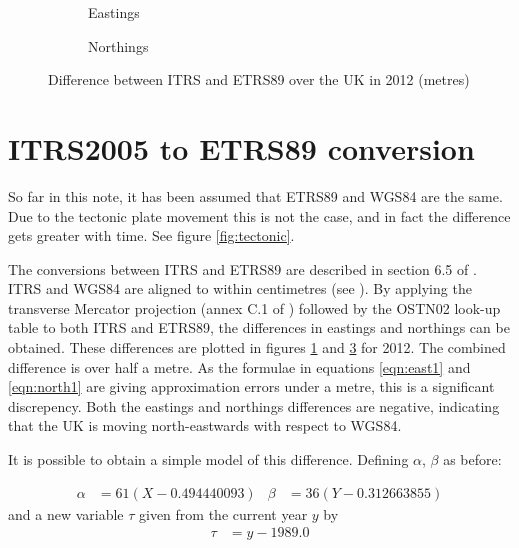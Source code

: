 \documentclass[10pt,a4paper]{article}
\def\tkname#1{}
\def\gap{\hspace{2cm}}
\begin{document}
\begin{figure}[htb]
  \begin{subfigure}[b]{0.4\textwidth}
    \tkname{itrs-etrs-east}
  \centering
  \fbox{
    
  }
  \caption{Eastings}
  \label{fig:itrs-etrs-east}
\end{subfigure}
\gap
  \begin{subfigure}[b]{0.4\textwidth}
    \tkname{itrs-etrs-north}
  \centering
  \fbox{
    
  }
  \caption{Northings}
  \label{fig:itrs-etrs-north}
\end{subfigure}
\caption{Difference between ITRS and ETRS89 over the UK in 2012 (metres)}
\hrulefill
\end{figure}

\section {ITRS2005 to ETRS89 conversion}

So far in this note, it has been assumed that ETRS89 and WGS84 are the same.
Due to the tectonic plate movement this is not the case, and in fact the
difference gets greater with time.  See figure \ref{fig:tectonic}.

The conversions between ITRS and ETRS89 are described in section 6.5 of
\cite{gcs}.  ITRS and WGS84 are aligned to within centimetres (see
\cite{itrs-wgs}).  By applying the transverse Mercator projection (annex C.1 of
\cite{gcs}) followed by the OSTN02 look-up table to both ITRS and ETRS89, the
differences in eastings and northings can be obtained.  These differences are
plotted in figures \ref{fig:itrs-etrs-east} and \ref{fig:itrs-etrs-north} for
2012.  The combined difference is over half a metre.  As the formulae in
equations \eqref{eqn:east1} and \eqref{eqn:north1} are giving approximation
errors under a metre, this is a significant discrepency.  Both the eastings and
northings differences are negative, indicating that the UK is moving
north-eastwards with respect to WGS84.

It is possible to obtain a simple model of this difference.  Defining $\alpha$,
$\beta$ as before:

\begin{align}
  \alpha &= 61 (X-0.494440093) &
  \beta  &= 36 (Y-0.312663855)
\end{align}
and a new variable $\tau$ given from the current year $y$ by
\begin{align}
  \tau   &= y - 1989.0
\end{align}
\end{document}
